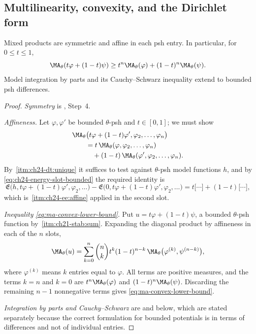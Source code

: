 \subsection{Multilinearity, convexity, and the Dirichlet form}
\label{sec:ch24-bounded-calculus}

\begin{corollary}\label{cor:bounded-ma-multilinearity}
Mixed products are symmetric and affine in each psh entry. In particular,
for \(0\leq t\leq1\),
\begin{equation}
\label{eq:ma-convex-lower-bound}
 \MA_\theta(t\varphi+(1-t)\psi)
 \geq t^n\MA_\theta(\varphi)+(1-t)^n\MA_\theta(\psi).
\end{equation}
Model integration by parts and its Cauchy--Schwarz inequality extend to
bounded psh differences.
\end{corollary}

\begin{proof}
\emph{Symmetry} is
, Step~4.

\emph{Affineness.}  Let \(\varphi,\varphi'\) be bounded \(\theta\)-psh and
\(t\in[0,1]\); we must show
\[
 \begin{aligned}
 &\MA_\theta\bigl(t\varphi+(1-t)\varphi',
     \varphi_2,\ldots,\varphi_n\bigr)\\
 &\qquad=t\,\MA_\theta(\varphi,\varphi_2,\ldots,\varphi_n)\\
 &\qquad\quad+(1-t)\,\MA_\theta(\varphi',\varphi_2,\ldots,\varphi_n).
 \end{aligned}
\]
By \,\cref{itm:ch24-dt:unique} it suffices to test
against \(\theta\)-psh model functions \(h\), and by
\eqref{eq:ch24-energy-slot-bounded} the required identity is
\[
 \mathfrak E\bigl(h,t\varphi+(1-t)\varphi',\varphi_2,\ldots\bigr)
 -\mathfrak E\bigl(0,t\varphi+(1-t)\varphi',\varphi_2,\ldots\bigr)
 =t\bigl[\cdots\bigr]+(1-t)\bigl[\cdots\bigr],
\]
which is
\,\cref{itm:ch24-ee:affine} applied in the
second slot.

\emph{Inequality \eqref{eq:ma-convex-lower-bound}.}  Put
\(u=t\varphi+(1-t)\psi\), a bounded \(\theta\)-psh function by
\,\cref{itm:ch21-stab:sum}.  Expanding the diagonal
product by affineness in each of the \(n\) slots,
\[
 \MA_\theta(u)=\sum_{k=0}^{n}\binom nk t^k(1-t)^{n-k}\,
   \MA_\theta\bigl(\varphi^{(k)},\psi^{(n-k)}\bigr),
\]
where \(\varphi^{(k)}\) means \(k\) entries equal to \(\varphi\).  All terms
are positive measures, and the terms \(k=n\) and \(k=0\) are
\(t^n\MA_\theta(\varphi)\) and \((1-t)^n\MA_\theta(\psi)\).  Discarding the
remaining \(n-1\) nonnegative terms gives
\eqref{eq:ma-convex-lower-bound}.

\emph{Integration by parts and Cauchy--Schwarz} are
 and
 below, which are stated separately
because the correct formulation for bounded potentials is in terms of
differences and not of individual entries.
\end{proof}

